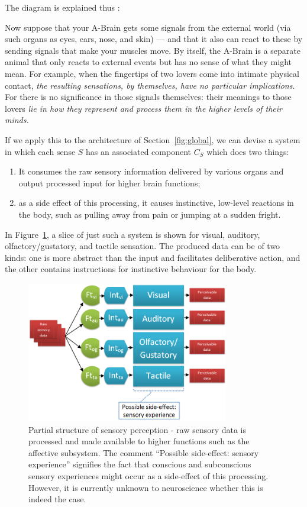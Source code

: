  \newpage
 
The diagram is explained thus \cite[p.\ 100]{emotionMachine}:

\begin{emquote}
	Now suppose that your A-Brain gets some signals from the external world (via such organs as eyes, ears, nose, and skin) --- and that it also can react to these by sending signals that make your muscles move. By itself, the A-Brain is a separate animal that only reacts to external events but has no sense of what they might mean. For example, when the fingertips of two lovers come into intimate physical contact, {\em the resulting sensations, by themselves, have no particular implications}. For there is no significance in those signals themselves: their meanings to those lovers {\em lie in how they represent and process them in the higher levels of their minds.}
\end{emquote}

If we apply this to the architecture of Section~\ref{fig:global}, we can devise a system in which each sense $S$ has an associated component $C_S$ which does two things:
\begin{enumerate}
	\item It consumes the raw sensory information delivered by various organs and output processed input for higher brain functions;
	\item as a side effect of this processing, it causes instinctive, low-level reactions in the body, such as pulling away from pain or jumping at a sudden fright.
\end{enumerate}

In Figure~\ref{fig:sensoryPerception}, a slice of just such a system is shown for visual, auditory, olfactory/gustatory, and tactile sensation. The produced data can be of two kinds: one is more abstract than the input and facilitates deliberative action, and the other contains instructions for instinctive behaviour for the body.

\begin{figure}[t]
	\centering
	\includegraphics[width=250pt]{Figs/sensoryPerception.png}
	\caption{Partial structure of sensory perception - raw sensory data is processed and made available to higher functions such as the affective subsystem. The comment ``Possible side-effect: sensory experience'' signifies the fact that conscious and subconscious sensory experiences might occur as a side-effect of this processing. However, it is currently unknown to neuroscience whether this is indeed the case.}
	\label{fig:sensoryPerception}
\end{figure}


